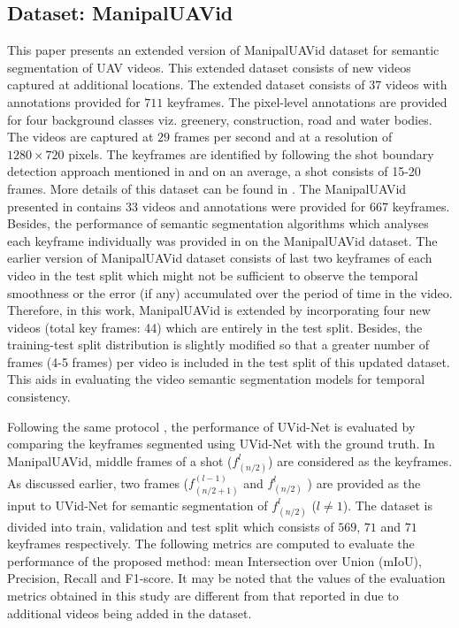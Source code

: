 \documentclass[journal]{IEEEtran}
\begin{document}
\subsection{Dataset: ManipalUAVid}
\par This paper presents an extended version of ManipalUAVid \cite{19} dataset for semantic segmentation of UAV videos. This extended dataset consists of new videos captured at additional locations. The extended dataset consists of $37$ videos with annotations provided for $711$ keyframes. The pixel-level annotations are provided for four background classes viz. greenery, construction, road and water bodies. The videos are captured at $29$ frames per second and at a resolution of $1280\times 720$ pixels. The keyframes are identified by following the shot boundary detection approach mentioned in \cite{19} and on an average, a shot consists of 15-20  frames. More details of this dataset can be found in \cite{19}.  The ManipalUAVid presented in \cite{19} contains 33 videos and annotations were provided for 667 keyframes.  Besides, the performance of semantic segmentation algorithms which analyses each keyframe individually was provided in \cite{19} on the ManipalUAVid dataset. The earlier version of ManipalUAVid dataset \cite{19} consists of last two keyframes of each video in the test split which might not be sufficient to observe the temporal smoothness or the error (if any) accumulated over the period of time in the video. Therefore, in this work, ManipalUAVid is extended by incorporating four new videos (total key frames: 44) which are entirely in the test split. Besides, the training-test split distribution is slightly modified so that a greater number of frames (4-5 frames) per video is included in the test split of this updated dataset. This aids in evaluating the video semantic segmentation models for temporal consistency. 


\par Following the same protocol \cite{19}, the performance of UVid-Net is evaluated by comparing the keyframes segmented using UVid-Net with the ground truth. In ManipalUAVid, middle frames of a shot ($f^{l}_{(n/2)}$) are considered as the keyframes.  As discussed earlier, two frames ($f_{(n/2+1)}^{(l-1)}$ and $f_{(n/2)}^l$ ) are provided as the input to UVid-Net for semantic segmentation  of $f_{(n/2)}^l$ ($l \neq 1$). The dataset is divided into train, validation and test split which consists of $569$, $71$ and $71$ keyframes respectively. The following metrics are computed to evaluate the performance of the proposed method: mean Intersection over Union (mIoU), Precision, Recall and F1-score.  It may be noted that the values of the evaluation metrics obtained in this study are different from that reported in \cite{19} due to additional videos being added in the dataset. 
\end{document}
